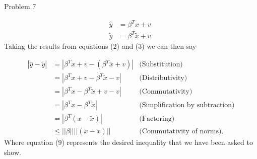 \begin{problem}{Problem 7}
\begin{highlight}[Solution]
        \begin{align}
            \hat{y} & = \beta^{T}x + v \\
            \tilde{y} & = \beta^{T}\tilde{x} + v.
        \end{align}
        Taking the results from equations (2) and (3) we can then say 

        \begin{align}
            |\hat{y} - \tilde{y}| & = |\beta^{T}x + v - (\beta^{T}\tilde{x} + v)| & \text{(Substitution)} \\
            & = |\beta^{T}x + v - \beta^{T}\tilde{x} - v| & \text{(Distributivity)} \\
            & = |\beta^{T}x - \beta^{T}\tilde{x} + v - v| & \text{(Commutativity)} \\
            & = |\beta^{T}x - \beta^{T}\tilde{x}| & \text{(Simplification by subtraction)} \\
            & = |\beta^{T}(x - \tilde{x})| & \text{(Factoring)} \\
            & \leq ||\beta||||(x - \tilde{x})|| & \text{(Commutativity of norms)}.
        \end{align}
        Where equation (9) represents the desired inequality that we have been asked to show.
    \end{highlight}
\end{problem}

